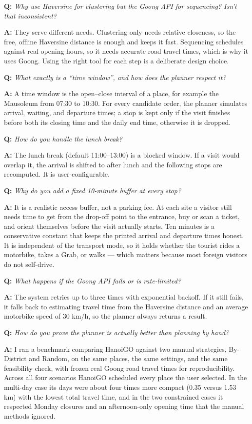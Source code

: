 \documentclass[12pt,a4paper]{article}
\newcommand{\Q}[1]{\medskip\noindent\textbf{Q:} \textit{#1}\par}
\newcommand{\A}{\noindent\textbf{A:} }
\begin{document}
\Q{Why use Haversine for clustering but the Goong API for sequencing? Isn't that
inconsistent?}
\A They serve different needs. Clustering only needs relative closeness, so the
free, offline Haversine distance is enough and keeps it fast. Sequencing schedules
against real opening hours, so it needs accurate road travel times, which is why
it uses Goong. Using the right tool for each step is a deliberate design choice.

\Q{What exactly is a ``time window'', and how does the planner respect it?}
\A A time window is the open--close interval of a place, for example the
Mausoleum from 07:30 to 10:30. For every candidate order, the planner simulates
arrival, waiting, and departure times; a stop is kept only if the visit finishes
before both its closing time and the daily end time, otherwise it is dropped.

\Q{How do you handle the lunch break?}
\A The lunch break (default 11:00--13:00) is a blocked window. If a visit would
overlap it, the arrival is shifted to after lunch and the following stops are
recomputed. It is user-configurable.

\Q{Why do you add a fixed 10-minute buffer at every stop?}
\A It is a realistic access buffer, not a parking fee. At each site a visitor
still needs time to get from the drop-off point to the entrance, buy or scan a
ticket, and orient themselves before the visit actually starts. Ten minutes is a
conservative constant that keeps the printed arrival and departure times honest.
It is independent of the transport mode, so it holds whether the tourist rides a
motorbike, takes a Grab, or walks --- which matters because most foreign visitors
do not self-drive.

\Q{What happens if the Goong API fails or is rate-limited?}
\A The system retries up to three times with exponential backoff. If it still
fails, it falls back to estimating travel time from the Haversine distance and an
average motorbike speed of 30 km/h, so the planner always returns a result.

\Q{How do you prove the planner is actually better than planning by hand?}
\A I ran a benchmark comparing HanoiGO against two manual strategies, By-District
and Random, on the same places, the same settings, and the same feasibility
check, with frozen real Goong road travel times for reproducibility. Across all
four scenarios HanoiGO scheduled every place the user selected. In the multi-day
case its days were about four times more compact (0.35 versus 1.53 km) with the
lowest total travel time, and in the two constrained cases it respected Monday
closures and an afternoon-only opening time that the manual methods ignored.
\end{document}
